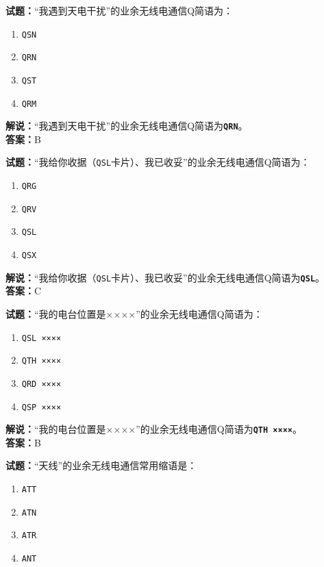 \documentclass{ctexbook}
\begin{document}
\bigskip

\noindent\textbf{试题：}“我遇到天电干扰”的业余无线电通信Q简语为：

\begin{enumerate}[leftmargin=3em]
  \item \texttt{QSN}
  \item \texttt{QRN}
  \item \texttt{QST}
  \item \texttt{QRM}
\end{enumerate}

\noindent\textbf{解说：}“我遇到天电干扰”的业余无线电通信Q简语为\texttt{\textbf{QRN}}。\\\noindent\textbf{答案：}B

\bigskip

\noindent\textbf{试题：}“我给你收据（\texttt{QSL}卡片）、我已收妥”的业余无线电通信Q简语为：

\begin{enumerate}[leftmargin=3em]
  \item \texttt{QRG}
  \item \texttt{QRV}
  \item \texttt{QSL}
  \item \texttt{QSX}
\end{enumerate}

\noindent\textbf{解说：}“我给你收据（\texttt{QSL}卡片）、我已收妥”的业余无线电通信Q简语为\texttt{\textbf{QSL}}。\\\noindent\textbf{答案：}C

\bigskip

\noindent\textbf{试题：}“我的电台位置是××××”的业余无线电通信Q简语为：

\begin{enumerate}[leftmargin=3em]
  \item \texttt{QSL ××××}
  \item \texttt{QTH ××××}
  \item \texttt{QRD ××××}
  \item \texttt{QSP ××××}
\end{enumerate}

\noindent\textbf{解说：}“我的电台位置是××××”的业余无线电通信Q简语为\texttt{\textbf{QTH ××××}}。\\\noindent\textbf{答案：}B

\bigskip

\noindent\textbf{试题：}“天线”的业余无线电通信常用缩语是：

\begin{enumerate}[leftmargin=3em]
  \item \texttt{ATT}
  \item \texttt{ATN}
  \item \texttt{ATR}
  \item \texttt{ANT}
\end{enumerate}
\end{document}
